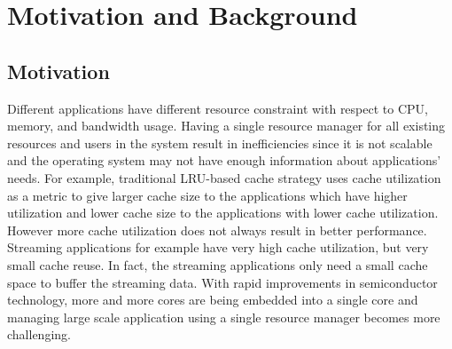 \section{Motivation and Background} \label{Motivation}
\subsection{Motivation}
Different applications have different resource constraint with respect to CPU, memory, and bandwidth usage. Having a single resource manager for all existing resources and users in the system result in inefficiencies since it is not scalable and the operating system may not have enough information about applications' needs. For example, traditional LRU-based cache strategy uses cache utilization as a metric to give larger cache size to the applications which have higher utilization and lower cache size to the applications with lower cache utilization. However more cache utilization does not always result in better performance. Streaming applications for example have very high cache utilization, but very small cache reuse. In fact, the streaming applications only need a small cache space to buffer the streaming data. With rapid improvements in semiconductor technology, more and more cores are being embedded into a single core and managing large scale application using a single resource manager becomes more challenging. \\
